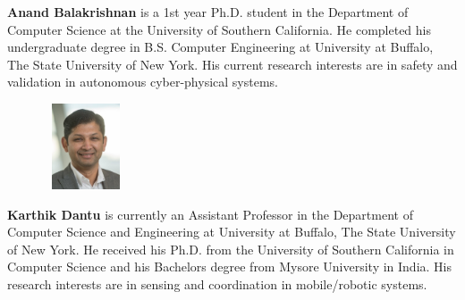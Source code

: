   \textbf{Anand Balakrishnan} is a 1st year Ph.D. student in the Department of Computer
Science at the University of Southern California. He completed his undergraduate degree in B.S. Computer Engineering at University at Buffalo, The State University of New York. His current research interests are in safety and validation in autonomous cyber-physical systems.\par
\begin{figure} 
    \includegraphics[width=1in,height=1in,clip,keepaspectratio]{./figures/Karthik.jpg}
  \end{figure}\par
  \textbf{Karthik Dantu} is currently an Assistant Professor in the Department of Computer
Science and Engineering at University at Buffalo, The State University of New
York. He received his Ph.D. from the University of Southern California in
Computer Science and his Bachelors degree from Mysore University in India. His
research interests are in sensing and coordination in mobile/robotic systems.\par



